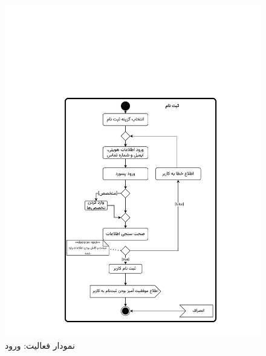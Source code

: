 \begin{figure}[ht!]
	\centering
	\includegraphics[scale=0.8, page=2]{figs/OOD-activity1-10.pdf}
	\caption{نمودار فعالیت: ورود}
\end{figure}
\FloatBarrier
\newpage

